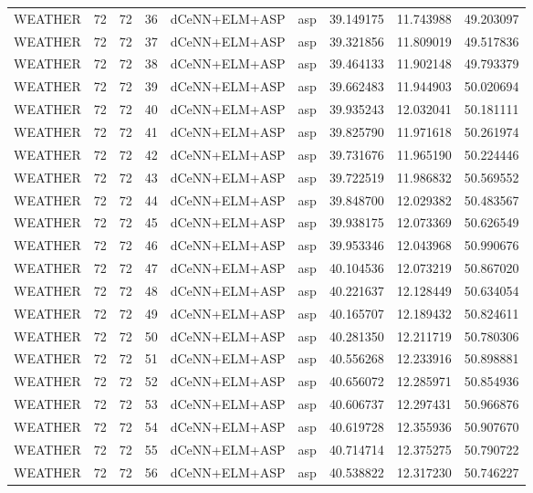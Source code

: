 \begin{table}
\begin{tabular}{lrrrllrrr}
WEATHER & 72 & 72 & 36 & dCeNN+ELM+ASP & asp & 39.149175 & 11.743988 & 49.203097 \\
WEATHER & 72 & 72 & 37 & dCeNN+ELM+ASP & asp & 39.321856 & 11.809019 & 49.517836 \\
WEATHER & 72 & 72 & 38 & dCeNN+ELM+ASP & asp & 39.464133 & 11.902148 & 49.793379 \\
WEATHER & 72 & 72 & 39 & dCeNN+ELM+ASP & asp & 39.662483 & 11.944903 & 50.020694 \\
WEATHER & 72 & 72 & 40 & dCeNN+ELM+ASP & asp & 39.935243 & 12.032041 & 50.181111 \\
WEATHER & 72 & 72 & 41 & dCeNN+ELM+ASP & asp & 39.825790 & 11.971618 & 50.261974 \\
WEATHER & 72 & 72 & 42 & dCeNN+ELM+ASP & asp & 39.731676 & 11.965190 & 50.224446 \\
WEATHER & 72 & 72 & 43 & dCeNN+ELM+ASP & asp & 39.722519 & 11.986832 & 50.569552 \\
WEATHER & 72 & 72 & 44 & dCeNN+ELM+ASP & asp & 39.848700 & 12.029382 & 50.483567 \\
WEATHER & 72 & 72 & 45 & dCeNN+ELM+ASP & asp & 39.938175 & 12.073369 & 50.626549 \\
WEATHER & 72 & 72 & 46 & dCeNN+ELM+ASP & asp & 39.953346 & 12.043968 & 50.990676 \\
WEATHER & 72 & 72 & 47 & dCeNN+ELM+ASP & asp & 40.104536 & 12.073219 & 50.867020 \\
WEATHER & 72 & 72 & 48 & dCeNN+ELM+ASP & asp & 40.221637 & 12.128449 & 50.634054 \\
WEATHER & 72 & 72 & 49 & dCeNN+ELM+ASP & asp & 40.165707 & 12.189432 & 50.824611 \\
WEATHER & 72 & 72 & 50 & dCeNN+ELM+ASP & asp & 40.281350 & 12.211719 & 50.780306 \\
WEATHER & 72 & 72 & 51 & dCeNN+ELM+ASP & asp & 40.556268 & 12.233916 & 50.898881 \\
WEATHER & 72 & 72 & 52 & dCeNN+ELM+ASP & asp & 40.656072 & 12.285971 & 50.854936 \\
WEATHER & 72 & 72 & 53 & dCeNN+ELM+ASP & asp & 40.606737 & 12.297431 & 50.966876 \\
WEATHER & 72 & 72 & 54 & dCeNN+ELM+ASP & asp & 40.619728 & 12.355936 & 50.907670 \\
WEATHER & 72 & 72 & 55 & dCeNN+ELM+ASP & asp & 40.714714 & 12.375275 & 50.790722 \\
WEATHER & 72 & 72 & 56 & dCeNN+ELM+ASP & asp & 40.538822 & 12.317230 & 50.746227 \\

\end{tabular}
\end{table}
